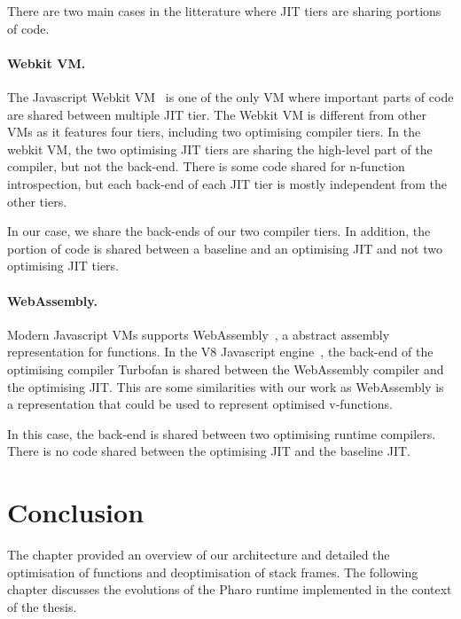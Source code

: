 \documentclass[a4paper,12pt,twoside]{../includes/ThesisStyle}
\begin{document}
There are two main cases in the litterature where JIT tiers are sharing portions of code.

\paragraph{Webkit VM.}The Javascript Webkit VM~\cite{Webkit15} is one of the only VM where important parts of code are shared between multiple JIT tier. The Webkit VM is different from other VMs as it features four tiers, including two optimising compiler tiers. In the webkit VM, the two optimising JIT tiers are sharing the high-level part of the compiler, but not the back-end. There is some code shared for n-function introspection, but each back-end of each JIT tier is mostly independent from the other tiers.

In our case, we share the back-ends of our two compiler tiers. In addition, the portion of code is shared between a baseline and an optimising JIT and not two optimising JIT tiers.

\paragraph{WebAssembly.}Modern Javascript VMs supports WebAssembly~\cite{WebAssembly}, a abstract assembly representation for functions. In the V8 Javascript engine~\cite{V8}, the back-end of the optimising compiler Turbofan is shared between the WebAssembly compiler and the optimising JIT. This are some similarities with our work as WebAssembly is a representation that could be used to represent optimised v-functions. 

In this case, the back-end is shared between two optimising runtime compilers. There is no code shared between the optimising JIT and the baseline JIT. 


\section*{Conclusion}

The chapter provided an overview of our architecture and detailed the optimisation of functions and deoptimisation of stack frames. The following chapter discusses the evolutions of the Pharo runtime implemented in the context of the thesis.

\ifx\wholebook\relax\else
    
\end{document}
